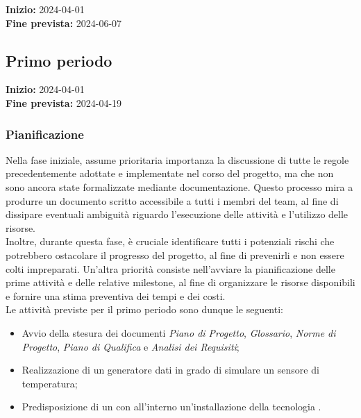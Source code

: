 \textbf{Inizio:} 2024-04-01\\
\textbf{Fine prevista:} 2024-06-07
\subsection{Primo periodo} \label{sec:1_rtb}
\textbf{Inizio:} 2024-04-01\\
\textbf{Fine prevista:} 2024-04-19
\subsubsection{Pianificazione}
Nella fase iniziale, assume prioritaria importanza la discussione di tutte le regole precedentemente adottate e implementate nel corso del progetto, ma che non sono ancora state formalizzate mediante documentazione. Questo processo mira a produrre un documento scritto accessibile a tutti i membri del team, al fine di dissipare eventuali ambiguità riguardo l'esecuzione delle attività e l'utilizzo delle risorse.
\\
Inoltre, durante questa fase, è cruciale identificare tutti i potenziali rischi che potrebbero ostacolare il progresso del progetto, al fine di prevenirli e non essere colti impreparati. Un'altra priorità consiste nell'avviare la pianificazione delle prime attività e delle relative milestone, al fine di organizzare le risorse disponibili e fornire una stima preventiva dei tempi e dei costi. \\
Le attività previste per il primo periodo sono dunque le seguenti:
\begin{itemize}
\setlength{\itemsep}{0}
    \item Avvio della stesura dei documenti \textit{Piano di Progetto}, \textit{Glossario}, \textit{Norme di Progetto}, \textit{Piano di Qualifica} e \textit{Analisi dei Requisiti};
    \item Realizzazione di un generatore dati in grado di simulare un sensore di temperatura;
    \item Predisposizione di un   con all'interno un'installazione della tecnologia .
\end{itemize}

